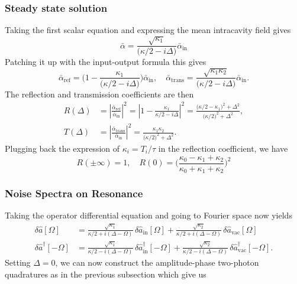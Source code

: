 \subsubsection{Steady state solution}
Taking the first scalar equation and expressing the mean intracavity field gives 
\begin{equation}
  \bar{\alpha} =  \frac{\sqrt{\kappa_1}}{\Big(\kappa/2-i\Delta\Big)}  \bar{\alpha}_{\mathrm{in}} 
\end{equation}
Patching it up with the input-output formula this gives 
\begin{equation}
  \bar{\alpha}_{\mathrm{ref}} =  \Bigg( 1 - \frac{\kappa_1}{\Big(\kappa/2-i\Delta\Big)}\Bigg)  \bar{\alpha}_{\mathrm{in}}  , \quad   \bar{\alpha}_{\mathrm{trans}} =  \frac{\sqrt{\kappa_1 \kappa_2}}{\Big(\kappa/2-i\Delta\Big)} \bar{\alpha}_{\mathrm{in}}.
\end{equation}
The reflection and transmission coefficients are then
\begin{align}
R(\Delta) &= \left|\frac{\bar{\alpha}_{\mathrm{ref}}}{\bar{\alpha}_{\mathrm{in}}}\right|^2
= \left| 1 - \frac{\kappa_1}{\kappa/2 - i\Delta} \right|^2
= \frac{\bigl(\kappa/2-\kappa_1\bigr)^2+\Delta^2}{\bigl(\kappa/2)^2+\Delta^2},\\[10pt]
T(\Delta) &= \left|\frac{\bar{\alpha}_{\mathrm{trans}}}{\bar{\alpha}_{\mathrm{in}}}\right|^2
= \frac{\kappa_1\kappa_2}{\bigl(\kappa/2\bigr)^2+\Delta^2}.
\end{align}
Plugging back the expression of $\kappa_i = T_i/\tau$ in the reflection coefficient, we have 
\begin{equation}
  R(\pm\infty) = 1 , \quad R(0) = \Bigg(\frac{\kappa_0 - \kappa_1 + \kappa_2}{\kappa_0 + \kappa_1 + \kappa_2}\Bigg)^2
\end{equation}

\subsubsection{Noise Spectra on Resonance}
Taking the operator differential equation and going to Fourier space now yields 
\begin{equation}
\begin{split}
    \delta \hat{a}[\Omega] &=  \frac{\sqrt{\kappa_1}}{\kappa/2+i(\Delta-\Omega)} \, \delta \hat{a}_{\mathrm{in}}[\Omega] + \frac{\sqrt{\kappa_2}}{\kappa/2+i(\Delta-\Omega)} \, \delta \hat{a}_{\mathrm{vac}}[\Omega] \\
    \delta \hat{a}^{\dagger}[-\Omega] &=  \frac{\sqrt{\kappa_1}}{\kappa/2-i(\Delta-\Omega)} \, \delta \hat{a}^{\dagger}_{\mathrm{in}}[-\Omega] + \frac{\sqrt{\kappa_2}}{\kappa/2-i(\Delta-\Omega)} \, \delta \hat{a}^\dagger_{\mathrm{vac}}[-\Omega].
\end{split}
\end{equation}
Setting $\Delta = 0$, we can now construct the amplitude-phase two-photon quadratures as in the previous subsection which give us 

